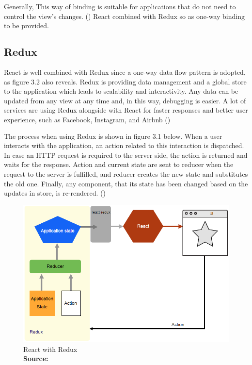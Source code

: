 Generally, This way of binding is suitable for applications that do not need to control the view's changes. (\cite{Reference21}) React combined with Redux so as one-way binding to be provided. \par

\subsection{Redux}

React is well combined with Redux since a one-way data flow pattern is adopted, as figure 3.2 also reveals. Redux is providing data management and a global store to the application which leads to scalability and interactivity. Any data can be updated from any view at any time and, in this way, debugging is easier. A lot of services are using Redux alongside with React for faster responses and better user experience, such as Facebook, Instagram, and Airbnb (\cite{Reference12})

The process when using Redux is shown in figure 3.1 below. When a user interacts with the application, an action related to this interaction is dispatched. In case an HTTP request is required to the server side, the action is returned and waits for the response. Action and current state are sent to reducer when the request to the server is fulfilled, and reducer creates the new state and substitutes the old one. Finally, any component, that its state has been changed based on the updates in store, is re-rendered. (\cite{murray2018ng})

\begin{figure}[h!]
	\begin{center}
		\includegraphics[scale=0.3]{images/Redux.png}
	\end{center}
	\caption{
		React with Redux
		\\
		\textbf{Source:} \cite{Reference12}
	}
\end{figure}

